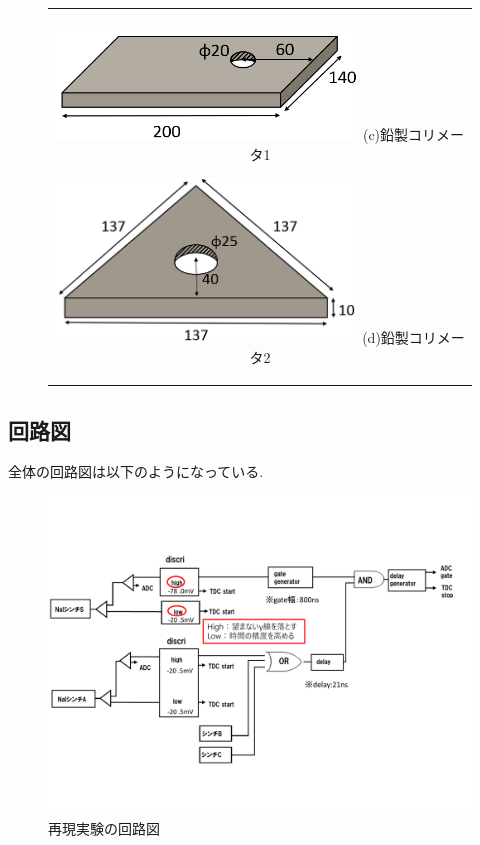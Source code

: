 \begin{figure}[H]
	\centering
		\begin{tabular}{c}
			\begin{minipage}{0.5\hsize}
				\centering
					\includegraphics[width=80mm]{fig/isb/leadcollimator1.png}
					\hspace{1.6cm} (c)鉛製コリメータ1
			\end{minipage}
			\begin{minipage}{0.5\hsize}
				\centering
					\includegraphics[width=80mm]{fig/isb/leadcollimator2.png}
					\hspace{1.6cm} (d)鉛製コリメータ2
			\end{minipage}
		\end{tabular}
\end{figure}

\newpage
\subsection{回路図}
全体の回路図は以下のようになっている.
\begin{figure}[H]
	\centering
		\includegraphics[width=15cm]{fig/isb/circuit.pdf}
		\caption{再現実験の回路図}
		\label{fig:circuit2015}
\end{figure}

